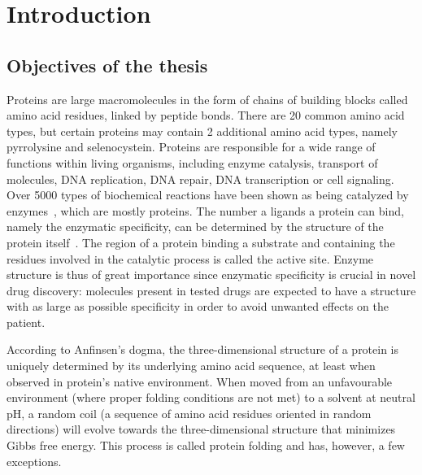 \chapter{Introduction}

\section{Objectives of the thesis}

    \setcounter{page}{1}
    \vspace*{0.5cm}

    Proteins are large macromolecules in the form of chains of building blocks called amino acid residues,
    linked by peptide bonds. There are 20 common amino acid types, but certain proteins may contain 2
    additional amino acid types, namely pyrrolysine and selenocystein. %
    Proteins are responsible for a wide range of functions within living organisms, including
    enzyme catalysis, transport of molecules, DNA replication, DNA repair, DNA transcription or cell signaling.
    Over 5000 types of biochemical reactions have been shown as being catalyzed by enzymes~\cite{schomburg2012brenda},
    which are mostly proteins. The number a ligands a protein can bind, namely the enzymatic specificity,
    can be determined by the structure of the protein itself~\cite{pi2004determination}.
    The region of a protein binding a substrate and containing
    the residues involved in the catalytic process is called the active site.
    Enzyme structure is thus of great importance since enzymatic specificity is crucial in novel drug discovery:
    molecules present in tested drugs are expected to have a structure with as large as possible specificity
    in order to avoid unwanted effects on the patient.

    According to Anfinsen's dogma, the three-dimensional structure of a protein is uniquely
    determined by its underlying amino acid sequence,
    at least when observed in protein's native environment. When moved from an unfavourable environment (where proper folding conditions are not met)
    to a solvent at neutral pH, a random coil (a sequence of amino acid residues
    oriented in random directions) will evolve towards the three-dimensional structure that minimizes Gibbs free energy.
    This process is called protein folding and has, however, a few exceptions.

